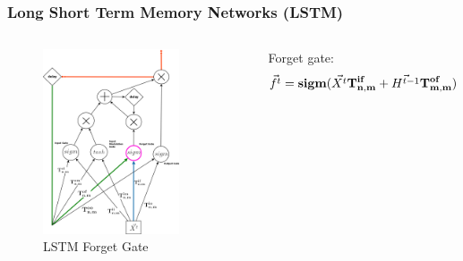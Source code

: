 \documentclass{beamer}
\begin{document}
\begin{frame}
\frametitle{Long Short Term Memory Networks (LSTM)}
\begin{columns}
\begin{figure}[t!]
    \centering
    \includegraphics[width=0.8\textwidth]{./pictures/figures/LSTM_forget_gate.png}
    \caption{LSTM Forget Gate}
    \label{fig:LSTM_forget_gate}
\end{figure}

Forget gate:
$$\vec{f^t} = \bold{sigm}(\vec{X^t}\bold{T_{n,m}^{if}} + \vec{H^{t-1}}\bold{T_{m,m}^{of}})$$
\end{columns}
\end{frame}
\end{document}
